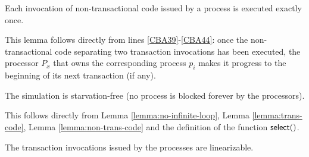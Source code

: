 \begin{lemma}
\label{lemma:non-trans-code}
Each invocation of non-transactional code issued by a process is
executed exactly once.
\end{lemma}

\begin{proofL}
This lemma  follows directly  from lines \ref{CBA39}-\ref{CBA44}:  once the
non-transactional  code separating two  transaction invocations  has been
executed, the processor $P_x$ that owns the corresponding process $p_i$ 
makes it progress to the beginning of its  next transaction (if any). 
\renewcommand{\toto}{lemma:non-trans-code}
\end{proofL}



\begin{lemma}
\label{lemma:process-progress}
The simulation is starvation-free (no process is blocked forever
by the processors).
\end{lemma}

\begin{proofL}
This follows directly from Lemma \ref{lemma:no-infinite-loop},
Lemma \ref{lemma:trans-code}, Lemma \ref{lemma:non-trans-code}
and the definition of the function ${\sf select}()$. 
\renewcommand{\toto}{lemma:process-progress}
\end{proofL}




\begin{lemma}
\label{lemma:trans-linearizability}
The transaction invocations issued by the processes are linearizable. 
\end{lemma}

